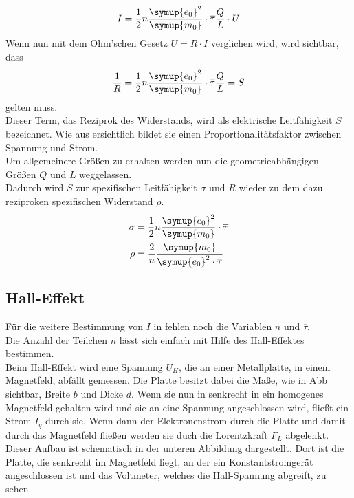 \begin{equation}
  I=\frac{1}{2}n\frac{\symup{e_0}^2}{\symup{m_0}}\cdot \overline{\tau} \frac{Q}{L} \cdot U
  \label{eqn:ohm1}
\end{equation}
Wenn nun  mit dem Ohm'schen Gesetz $U=R\cdot I$ verglichen wird, wird sichtbar, dass 
\begin{equation}
  \frac{1}{R}=\frac{1}{2}n\frac{\symup{e_0}^2}{\symup{m_0}}\cdot \overline{\tau} \frac{Q}{L} = S\nonumber
\end{equation}
gelten muss.\\
Dieser Term, das Reziprok des Widerstands, wird als elektrische Leitfähigkeit $S$ bezeichnet. Wie aus  ersichtlich bildet
sie einen Proportionalitätsfaktor zwischen Spannung und Strom.\\
Um allgemeinere Größen zu erhalten werden nun die geometrieabhängigen Größen $Q$ und $L$ weggelassen.\\
Dadurch wird $S$ zur spezifischen Leitfähigkeit $\sigma$ und $R$ wieder zu dem dazu reziproken spezifischen Widerstand $\rho$.
\begin{align}
  \sigma&=\frac{1}{2}n\frac{\symup{e_0}^2}{\symup{m_0}} \cdot \overline{\tau} \label{eqn:sigma}\\
  \rho &=\frac{2}{n}\frac{\symup{m_0}}{\symup{e_0}^2 \cdot \overline{\tau}}  \label{eqn:rho}
\end{align}



\subsection{Hall-Effekt}

Für die weitere Bestimmung von $I$ in  fehlen noch die Variablen $n$ und $\overline{\tau}$.\\
Die Anzahl der Teilchen $n$ lässt sich einfach mit Hilfe des Hall-Effektes bestimmen.\\
Beim Hall-Effekt wird eine Spannung $U_H$, die an einer Metallplatte, in einem Magnetfeld, abfällt gemessen.
Die Platte besitzt dabei die Maße, wie in Abb  sichtbar, Breite $b$ und Dicke $d$.
Wenn sie nun in senkrecht in ein homogenes Magnetfeld gehalten wird und sie an eine Spannung angeschlossen wird, fließt ein Strom $I_q$ durch sie.
Wenn dann der Elektronenstrom durch die Platte und damit durch das Magnetfeld fließen werden sie duch die Lorentzkraft $F_L$ abgelenkt.\\
Dieser Aufbau ist schematisch in der unteren Abbildung  dargestellt. Dort ist die Platte, die senkrecht im Magnetfeld liegt, 
an der ein Konstantstromgerät angeschlossen ist und das Voltmeter, welches die Hall-Spannung abgreift, zu sehen. 

